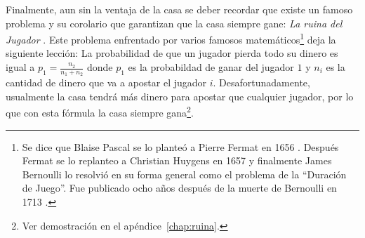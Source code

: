 \begin{table}[ht]
\centering
{}
\caption{Ventajas de la casa para juegos populares de casino \cite{hannum2005practical}}
\label{ventaja-casa}
\end{table}

Finalmente, aun sin la ventaja de la casa se deber recordar que existe un famoso problema y su corolario que garantizan que la casa siempre gane: \emph{La ruina del Jugador} \cite[p.~95-99]{ross2006first}. Este problema enfrentado por varios famosos matemáticos\footnote{Se dice que Blaise Pascal se lo planteó a Pierre Fermat en 1656 \cite{edwards1983pascal}. Después Fermat se lo replanteo a Christian Huygens en 1657 y finalmente James Bernoulli lo resolvió en su forma general como el problema de la ``Duración de Juego''. Fue publicado ocho años después de la muerte de Bernoulli en 1713 \cite[p.~98]{ross2006first}.} deja la siguiente lección: La probabilidad de que un jugador pierda todo su dinero es igual a  $p_1 = \frac{n_2}{n_1 + n_2}$ donde $p_1$ es la probabildad de ganar del jugador $1$ y $n_i$ es la cantidad de dinero que va a apostar el jugador $i$. Desafortunadamente, usualmente la casa tendrá más dinero para apostar que cualquier jugador, por lo que con esta fórmula la casa siempre gana\footnote{Ver demostración en el apéndice~\ref{chap:ruina}.}.


